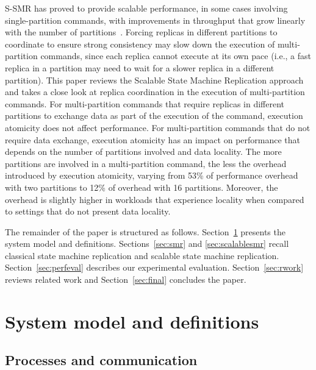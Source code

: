 \documentclass[11pt]{article}
\begin{document}
S-SMR has proved to provide scalable performance, in some cases involving single-partition commands, with improvements in throughput that grow linearly with the number of partitions~\cite{bezerra2014ssmr}.
Forcing replicas in different partitions to coordinate to ensure strong consistency may slow down the execution of multi-partition commands, since each replica cannot execute at its own pace (i.e., a fast replica in a partition may need to wait for a slower replica in a different partition).
%
This paper reviews the Scalable State Machine Replication approach and takes a close look at replica coordination in the execution of multi-partition commands.
For multi-partition commands that require replicas in different partitions to exchange data as part of the execution of the command, execution atomicity does not affect performance.
For multi-partition commands that do not require data exchange, execution atomicity has an impact on performance that depends on the number of partitions involved and data locality.
The more partitions are involved in a multi-partition command, the less the overhead introduced by execution atomicity, varying from 53\% of performance overhead with two partitions to 12\% of overhead with 16 partitions.
Moreover, the overhead is slightly higher in workloads that experience locality when compared to settings that do not present data locality.


The remainder of the paper is structured as follows.
Section~\ref{sec:sysmodel} presents the system model and definitions.
Sections~\ref{sec:smr} and \ref{sec:scalablesmr} recall classical state machine replication and scalable state machine replication.
Section~\ref{sec:perfeval} describes our experimental evaluation.
Section~\ref{sec:rwork} reviews related work and Section~\ref{sec:final} concludes the paper.

\section{System model and definitions}
\label{sec:sysmodel}

\subsection{Processes and communication}
\end{document}
